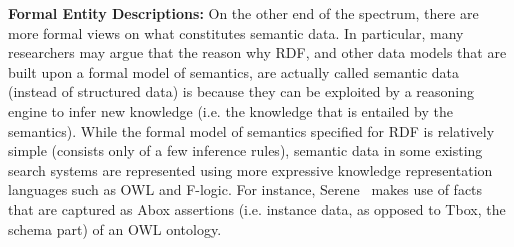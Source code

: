 \textbf{Formal Entity Descriptions:} On the other end of the spectrum, there are more formal views on what constitutes semantic data. In particular, many researchers may argue that the reason why RDF, and other data models that are built upon a formal model of semantics, are actually called semantic data (instead of structured data) is because they can be exploited by a reasoning engine to infer new knowledge (i.e. the knowledge that is entailed by the semantics). While the formal model of semantics specified for RDF is relatively simple (consists only of a few inference rules), semantic data in some existing search systems are represented using more expressive knowledge representation languages such as OWL and F-logic. 
For instance, Serene~\cite{DBLP:journals/ws/FazzingaGGL11} makes use of facts that are captured as Abox assertions (i.e. instance data, as opposed to Tbox, the schema part) of an OWL ontology. 


	

